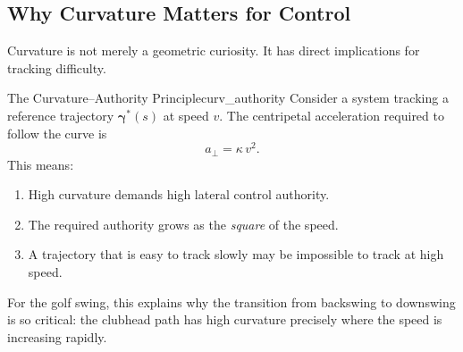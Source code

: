 \documentclass[12pt, openany]{book}
\theoremstyle{plain}
\newcommand{\traj}{\bm{\gamma}}
\begin{document}
\subsection{Why Curvature Matters for Control}

Curvature is not merely a geometric curiosity. It has direct implications for
tracking difficulty.

\begin{principle}{The Curvature--Authority Principle}{curv_authority}
  Consider a system tracking a reference trajectory $\traj^*(s)$ at speed $v$.
  The centripetal acceleration required to follow the curve is
  \begin{equation}\label{eq:centripetal}
    a_\perp = \kappa\, v^2.
  \end{equation}
  This means:
  \begin{enumerate}[label=(\roman*)]
    \item High curvature demands high lateral control authority.
    \item The required authority grows as the \emph{square} of the speed.
    \item A trajectory that is easy to track slowly may be impossible to track
          at high speed.
  \end{enumerate}
  For the golf swing, this explains why the transition from backswing to
  downswing is so critical: the clubhead path has high curvature precisely
  where the speed is increasing rapidly.
\end{principle}
\end{document}
